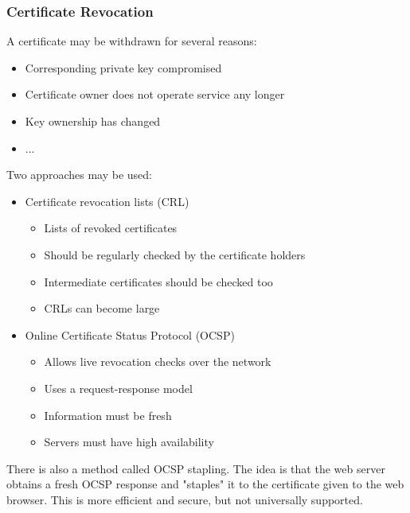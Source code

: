 \documentclass[10pt,a4paper]{report}
\begin{document}
\subsubsection{Certificate Revocation}
A certificate may be withdrawn for several reasons:
\begin{itemize}
\item Corresponding private key compromised
\item Certificate owner does not operate service any longer
\item Key ownership has changed
\item ...
\end{itemize}
Two approaches may be used:
\begin{itemize}
\item Certificate revocation lists (CRL)
\begin{itemize}
\item Lists of revoked certificates
\item Should be regularly checked by the certificate holders
\item Intermediate certificates should be checked too
\item CRLs can become large
\end{itemize}
\item Online Certificate Status Protocol (OCSP)
\begin{itemize}
\item Allows live revocation checks over the network
\item Uses a request-response model
\item Information must be fresh
\item Servers must have high availability
\end{itemize}
\end{itemize}
There is also a method called OCSP stapling. The idea is that the web server obtains a fresh OCSP response and
"staples" it to the certificate given to the web browser. This is more efficient and secure, but not universally supported.
\end{document}
